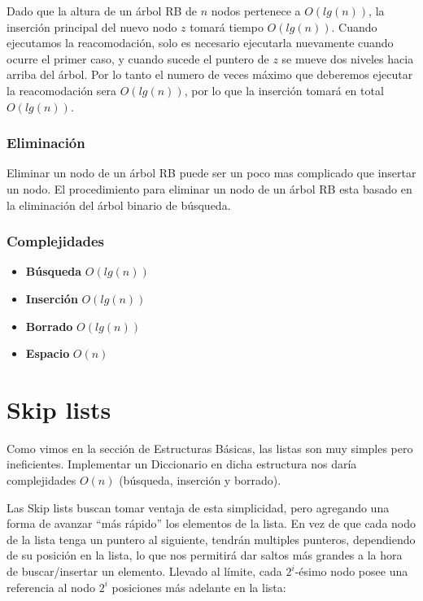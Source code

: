 Dado que la altura de un \'arbol RB de $n$ nodos pertenece a $O(lg(n))$, la inserci\'on principal del nuevo nodo $z$ tomar\'a tiempo $O(lg(n))$. Cuando ejecutamos la reacomodaci\'on, solo es necesario ejecutarla nuevamente cuando ocurre el primer caso, y cuando sucede el puntero de $z$ se mueve dos niveles hacia arriba del \'arbol. Por lo tanto el numero de veces m\'aximo que deberemos ejecutar la reacomodaci\'on sera $O(lg(n))$, por lo que la inserci\'on tomar\'a en total $O(lg(n))$.

\subsubsection{Eliminaci\'on}

Eliminar un nodo de un \'arbol RB puede ser un poco mas complicado que insertar un nodo. El procedimiento para eliminar un nodo de un \'arbol RB esta basado en la eliminaci\'on del \'arbol binario de b\'usqueda.


\subsubsection{Complejidades}

\begin{itemize}
 \item \textbf{B\'usqueda} $O(lg(n))$
 \item \textbf{Inserci\'on} $O(lg(n))$
 \item \textbf{Borrado} $O(lg(n))$
 \item \textbf{Espacio} $O(n)$
\end{itemize}

\newpage
\section{Skip lists}

Como vimos en la secci\'on de Estructuras B\'asicas, las listas son muy simples pero ineficientes. Implementar un Diccionario en dicha estructura nos dar\'ia complejidades $O(n)$ (b\'usqueda, inserci\'on y borrado).

Las Skip lists buscan tomar ventaja de esta simplicidad, pero agregando una forma de avanzar ``m\'as r\'apido'' los elementos de la lista.
En vez de que cada nodo de la lista tenga un puntero al siguiente, tendr\'an multiples punteros, dependiendo de su posici\'on en la lista, lo que nos permitir\'a dar saltos m\'as grandes a la hora de buscar/insertar un elemento.
Llevado al l\'imite, cada $2^i$-\'esimo nodo posee una referencia al nodo $2^i$ posiciones m\'as adelante en la lista:

